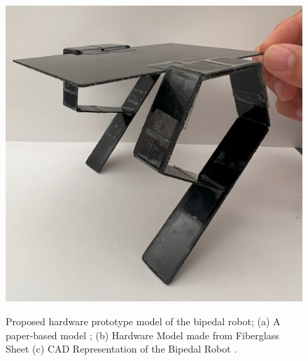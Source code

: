 \documentclass[12pt]{article}
\begin{document}
\begin{figure}[H]
{        \includegraphics[scale = 0.5]{figures/Picture2.png}
    }
    \caption{Proposed hardware prototype model of the bipedal robot; (a) A paper-based model ; (b) Hardware Model made from Fiberglass Sheet (c) CAD Representation of the Bipedal Robot .}
    \label{fig: proposed_prototype}
\end{figure}
\end{document}
